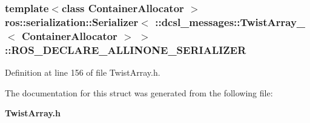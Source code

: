 \subsubsection[{\-R\-O\-S\-\_\-\-D\-E\-C\-L\-A\-R\-E\-\_\-\-A\-L\-L\-I\-N\-O\-N\-E\-\_\-\-S\-E\-R\-I\-A\-L\-I\-Z\-E\-R}]{\setlength{\rightskip}{0pt plus 5cm}template$<$class Container\-Allocator $>$ ros\-::serialization\-::\-Serializer$<$ \-::{\bf dcsl\-\_\-messages\-::\-Twist\-Array\-\_\-}$<$ \-Container\-Allocator $>$ $>$\-::{\bf \-R\-O\-S\-\_\-\-D\-E\-C\-L\-A\-R\-E\-\_\-\-A\-L\-L\-I\-N\-O\-N\-E\-\_\-\-S\-E\-R\-I\-A\-L\-I\-Z\-E\-R}}\label{structros_1_1serialization_1_1Serializer_3_01_1_1dcsl__messages_1_1TwistArray___3_01ContainerAllocator_01_4_01_4_ab25c5e297801b9c278a6973567f2dbea}


\-Definition at line 156 of file \-Twist\-Array.\-h.



\-The documentation for this struct was generated from the following file\-:\begin{DoxyCompactItemize}
\item 
{\bf \-Twist\-Array.\-h}\end{DoxyCompactItemize}
